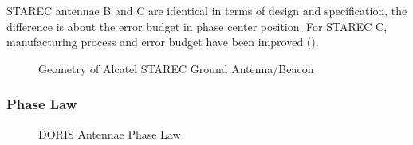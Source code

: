 STAREC antennae B and C are identical in terms of design and specification, the
difference is about the error budget in phase center position. For STAREC C,
manufacturing process and error budget have been improved (\cite{DORISGSM}).

\begin{figure}
\centering

\caption{Geometry of Alcatel STAREC Ground Antenna/Beacon}
\label{fig:starec-antenna}
\end{figure}

\subsubsection{Phase Law}\label{doris-phase-law}

\begin{figure}
\centering

\caption{DORIS Antennae Phase Law}
\label{fig:doris-antennae-phase-law}
\end{figure}
